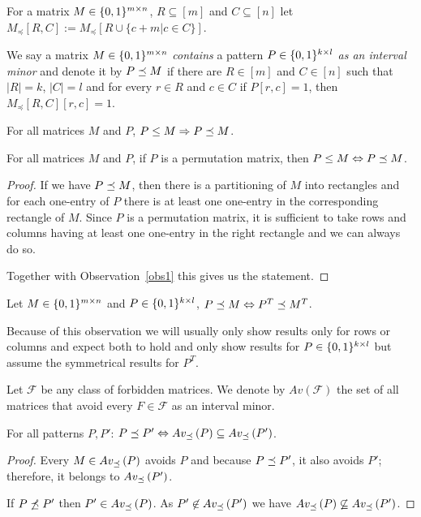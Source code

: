 \begin{ntn}
For a matrix $M\in\{0,1\}^{m\times n}$, $R\subseteq[m]$ and $C\subseteq[n]$ let $M_{\preceq}[R,C]:=M_{\preceq}[R\cup \{c+m|c\in C\}]$.
\end{ntn}
\begin{defn}
We say a matrix $M\in\{0,1\}^{m\times n}$ \emph{contains} a pattern $P\in\{0,1\}^{k\times l}$ \emph{as an interval minor} and denote it by $P\preceq M$ if there are $R\in[m]$ and $C\in[n]$ such that $|R|=k$, $|C|=l$ and for every $r\in R$ and $c\in C$ if $P[r,c]=1$, then $M_{\preceq}[R,C][r,c]=1$.
\end{defn}
%
%
%
\begin{obs}
\label{obs1}
For all matrices $M$ and $P$, $P\leq M\Rightarrow P\preceq M$.
\end{obs}
\begin{obs}
For all matrices $M$ and $P$, if $P$ is a permutation matrix, then $P\leq M\Leftrightarrow P\preceq M$.
\end{obs}
\begin{proof}
If we have $P\preceq M$, then there is a partitioning of $M$ into rectangles and for each one-entry of $P$ there is at least one one-entry in the corresponding rectangle of $M$. Since $P$ is a permutation matrix, it is sufficient to take rows and columns having at least one one-entry in the right rectangle and we can always do so.

Together with Observation~\ref{obs1} this gives us the statement.
\end{proof}
\begin{obs}
Let $M\in\{0,1\}^{m\times n}$ and $P\in\{0,1\}^{k\times l}$, $P\preceq M\Leftrightarrow P^T\preceq M^T$.
\end{obs}
Because of this observation we will usually only show results only for rows or columns and expect both to hold and only show results for $P\in\{0,1\}^{k\times l}$ but assume the symmetrical results for $P^T$.

\begin{defn}
Let $\mathcal{F}$ be any class of forbidden matrices. We denote by $Av(\mathcal{F})$ the set of all matrices that avoid every $F\in\mathcal{F}$ as an interval minor.
\end{defn}
\begin{obs}
For all patterns $P,P'$: $P\preceq P'\Leftrightarrow Av_{\preceq}\left(P\right)\subseteq Av_{\preceq}\left(P'\right)$.
\end{obs}
\begin{proof}
Every $M\in Av_{\preceq}\left(P\right)$ avoids $P$ and because $P\preceq P'$, it also avoids $P'$; therefore, it belongs to $Av_{\preceq}\left(P'\right)$.

If $P\not\preceq P'$ then $P'\in Av_{\preceq}\left(P\right)$. As $P'\not\in Av_{\preceq}\left(P'\right)$ we have $Av_{\preceq}\left(P\right)\not\subseteq Av_{\preceq}\left(P'\right)$.
\end{proof}

